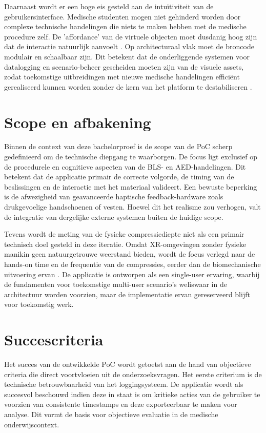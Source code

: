  Daarnaast wordt er een hoge eis gesteld aan de intuïtiviteit van de gebruikersinterface. Medische studenten mogen niet gehinderd worden door complexe technische handelingen die niets te maken hebben met de medische procedure zelf. De 'affordance' van de virtuele objecten moet dusdanig hoog zijn dat de interactie natuurlijk aanvoelt \cite{Pottle2019}. Op architecturaal vlak moet de broncode modulair en schaalbaar zijn. Dit betekent dat de onderliggende systemen voor datalogging en scenario-beheer gescheiden moeten zijn van de visuele assets, zodat toekomstige uitbreidingen met nieuwe medische handelingen efficiënt gerealiseerd kunnen worden zonder de kern van het platform te destabiliseren \cite{Radianti2020VRHE}.
 
 \section{Scope en afbakening}
 Binnen de context van deze bachelorproef is de scope van de PoC scherp gedefinieerd om de technische diepgang te waarborgen. De focus ligt exclusief op de procedurele en cognitieve aspecten van de BLS- en AED-handelingen. Dit betekent dat de applicatie primair de correcte volgorde, de timing van de beslissingen en de interactie met het materiaal valideert. Een bewuste beperking is de afwezigheid van geavanceerde haptische feedback-hardware zoals drukgevoelige handschoenen of vesten. Hoewel dit het realisme zou verhogen, valt de integratie van dergelijke externe systemen buiten de huidige scope.
 
 Tevens wordt de meting van de fysieke compressiediepte niet als een primair technisch doel gesteld in deze iteratie. Omdat XR-omgevingen zonder fysieke manikin geen natuurgetrouwe weerstand bieden, wordt de focus verlegd naar de hands-on time en de frequentie van de compressies, eerder dan de biomechanische uitvoering ervan \cite{ILCOR2023Immersive}. De applicatie is ontworpen als een single-user ervaring, waarbij de fundamenten voor toekomstige multi-user scenario's weliswaar in de architectuur worden voorzien, maar de implementatie ervan gereserveerd blijft voor toekomstig werk.
 
 \section{Succescriteria}
 Het succes van de ontwikkelde PoC wordt getoetst aan de hand van objectieve criteria die direct voortvloeien uit de onderzoeksvragen. Het eerste criterium is de technische betrouwbaarheid van het loggingsysteem. De applicatie wordt als succesvol beschouwd indien deze in staat is om kritieke acties van de gebruiker te voorzien van consistente timestamps en deze exporteerbaar te maken voor analyse. Dit vormt de basis voor objectieve evaluatie in de medische onderwijscontext.
 
